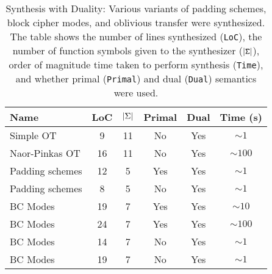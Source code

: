 
\begin{table}[t]
\begin{center}
\begin{tabular}{||l|c|c|c|c|c||}
  \hline
  Name & LoC & $|{\Sigma}|$ & P{\small{rimal}} & D{\small{ual}} & T{\small{ime (s)}}
  \\
  \hline
  Simple OT & 9 & 11 & No & Yes & $\sim 1$
  \\
  Naor-Pinkas OT & 16 & 11 & No & Yes & $\sim 100$
  \\
  Padding schemes & 12 & 5 & Yes & Yes & $\sim 1$
  \\
  Padding schemes & 8 & 5 & No & Yes & $\sim 1$
  \\
  BC Modes & 19 & 7 & Yes & Yes & $\sim 10$
  \\
  BC Modes & 24 & 7 & Yes & Yes & $\sim 100$
  \\
  BC Modes & 14 & 7 & No & Yes & $\sim 1$
  \\
  BC Modes & 19 & 7 & No & Yes & $\sim 1$
  \\ \hline
\end{tabular}
\end{center}
\caption{{\small{Synthesis with Duality: Various variants of padding schemes, block cipher modes,
and oblivious transfer were synthesized. The table shows the number of lines synthesized
({\tt{LoC}}),
the number of function symbols given to the synthesizer (${\mathtt{|{\Sigma}|}}$), 
order of magnitude time taken to perform synthesis ({\tt{Time}}), and whether
primal ({\tt{Primal}}) and dual ({\tt{Dual}}) semantics were used.}}}
\label{table}
\end{table}

